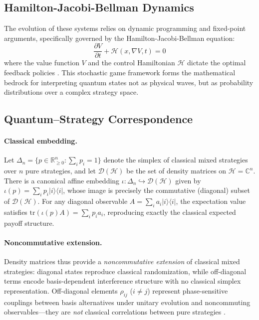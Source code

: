 \documentclass[12pt,a4paper]{article}
\theoremstyle{remark}
\begin{document}
\subsection{Hamilton-Jacobi-Bellman Dynamics}

The evolution of these systems relies on dynamic programming and fixed-point arguments, specifically governed by the Hamilton-Jacobi-Bellman equation:
\begin{equation}
\frac{\partial V}{\partial t} + \mathcal{H}\left(x, \nabla V, t\right) = 0
\end{equation}
where the value function $V$ and the control Hamiltonian $\mathcal{H}$ dictate the optimal feedback policies \citep{LasryLions2007}. This stochastic game framework forms the mathematical bedrock for interpreting quantum states not as physical waves, but as probability distributions over a complex strategy space.

\subsection{Quantum--Strategy Correspondence}

\paragraph{Classical embedding.}
Let $\Delta_n = \{p \in \mathbb{R}_{\geq 0}^n : \sum_i p_i = 1\}$ denote the simplex of classical mixed strategies over $n$ pure strategies, and let $\mathcal{D}(\mathcal{H})$ be the set of density matrices on $\mathcal{H} = \mathbb{C}^n$. There is a canonical affine embedding $\iota: \Delta_n \hookrightarrow \mathcal{D}(\mathcal{H})$ given by $\iota(p) = \sum_i p_i |i\rangle\langle i|$, whose image is precisely the commutative (diagonal) subset of $\mathcal{D}(\mathcal{H})$. For any diagonal observable $A = \sum_i a_i |i\rangle\langle i|$, the expectation value satisfies $\mathrm{tr}(\iota(p) A) = \sum_i p_i a_i$, reproducing exactly the classical expected payoff structure.

\paragraph{Noncommutative extension.}
Density matrices thus provide a \emph{noncommutative extension} of classical mixed strategies: diagonal states reproduce classical randomization, while off-diagonal terms encode basis-dependent interference structure with no classical simplex representation. Off-diagonal elements $\rho_{ij}$ ($i \neq j$) represent phase-sensitive couplings between basis alternatives under unitary evolution and noncommuting observables---they are \emph{not} classical correlations between pure strategies \citep{Lindblad1976}.
\end{document}
